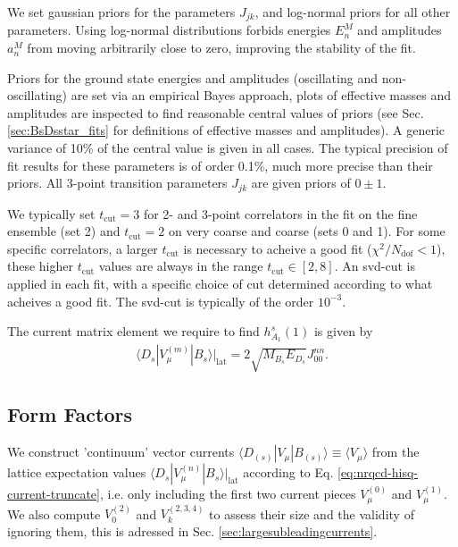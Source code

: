 We set gaussian priors for the parameters $J_{jk}$, and log-normal priors for all other parameters. Using log-normal distributions forbids energies $E_n^M$ and amplitudes $a_n^M$ from moving arbitrarily close to zero, improving the stability of the fit.

Priors for the ground state energies and amplitudes (oscillating and non-oscillating) are set via an empirical Bayes approach, plots of effective masses and amplitudes are inspected to find reasonable central values of priors (see Sec. \ref{sec:BsDsstar_fits} for definitions of effective masses and amplitudes). A generic variance of 10\% of the central value is given in all cases. The typical precision of fit results for these parameters is of order 0.1\%, much more precise than their priors. All 3-point transition parameters $J_{jk}$ are given priors of $0\pm 1$.

We typically set $t_{\text{cut}}=3$ for 2- and 3-point correlators in the fit on the fine ensemble (set 2) and $t_{\text{cut}}=2$ on very coarse and coarse (sets 0 and 1). For some specific correlators, a larger $t_{\text{cut}}$ is necessary to acheive a good fit ($\chi^2/N_{\text{dof}} < 1$), these higher $t_{\text{cut}}$ values are always in the range $t_{\text{cut}}\in[2,8]$. An svd-cut is applied in each fit, with a specific choice of cut determined according to what acheives a good fit. The svd-cut is typically of the order $10^{-3}$.

The current matrix element we require to find $h_{A_1}^s(1)$ is given by
\begin{align}
  \langle D_s | V_{\mu}^{(m)} | B_s \rangle |_{\text{lat}} = 2 \sqrt{M_{B_s}E_{D_s}} J^{nn}_{00}.
  \label{eq:currentfit}
\end{align}

\subsection{Form Factors}

We construct 'continuum' vector currents $\langle D_{(s)}| V_{\mu} | B_{(s)} \rangle \equiv \langle V_{\mu} \rangle$ from the lattice expectation values $\langle D_s | V_{\mu}^{(n)} | B_s \rangle |_{\text{lat}}$ according to Eq. \eqref{eq:nrqcd-hisq-current-truncate}, i.e. only including the first two current pieces $V^{(0)}_{\mu}$ and $V^{(1)}_{\mu}$. We also compute $V^{(2)}_{0}$ and $V^{(2,3,4)}_k$ to assess their size and the validity of ignoring them, this is adressed in Sec. \ref{sec:largesubleadingcurrents}.

